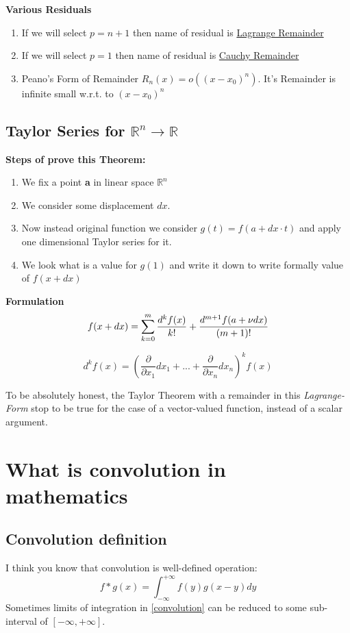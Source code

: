 \documentclass[12pt,a4paper]{article}
\theoremstyle{plain}
\begin{document}
\textbf{Various Residuals}
\begin{enumerate}
	\item If we will select $p=n+1$ then name of residual is \href{https://mathworld.wolfram.com/LagrangeRemainder.html}{Lagrange Remainder}
	\item If we will select $p=1$ then name of residual is \href{https://mathworld.wolfram.com/CauchyRemainder.html}{Cauchy Remainder}	
	\item Peano's Form of Remainder $R_n(x)=o((x-x_0)^n)$. It's Remainder is infinite small w.r.t. to $(x-x_0)^n$
\end{enumerate}

\subsection{Taylor Series for $\mathbb{R}^n \to \mathbb{R}$}

\textbf{Steps of prove this Theorem:}
\begin{enumerate}
\item We fix a point \textbf{a} in linear space $\mathbb{R}^n$ 
\item We consider some displacement $dx$.
\item Now instead original function we consider $g(t)=f(a+dx \cdot t)$ and apply one dimensional Taylor series for it.
\item We look what is a value for $g(1)$ and write it down to write formally value of $f(x+dx)$ 
\end{enumerate}

\textbf{Formulation}
\begin{equation}
	f(x+dx)=\sum_{k=0}^{m}\dfrac{d^kf(x)}{k!}+\dfrac{d^{m+1}f(a+\nu dx)}{(m+1)!}\\
\end{equation}

\begin{equation}
	d^kf(x)=\left(\frac{\partial}{\partial x_1}dx_1+...+\frac{\partial}{\partial x_n}dx_n\right)^kf(x)
\end{equation}

To be absolutely honest, the Taylor Theorem with a remainder in this \textit{Lagrange-Form} stop to be true for the case of a vector-valued function, instead of a scalar argument.


\section{What is convolution in mathematics}
\subsection{Convolution definition}
I think you know that convolution is well-defined operation:
\begin{equation}\label{convolution}
f*g(x)=\int^{+\infty}_{-\infty} f(y)g(x-y)dy
\end{equation}
Sometimes limits of integration in \eqref{convolution} can be reduced to some sub-interval of $[-\infty, +\infty]$.
\end{document}
